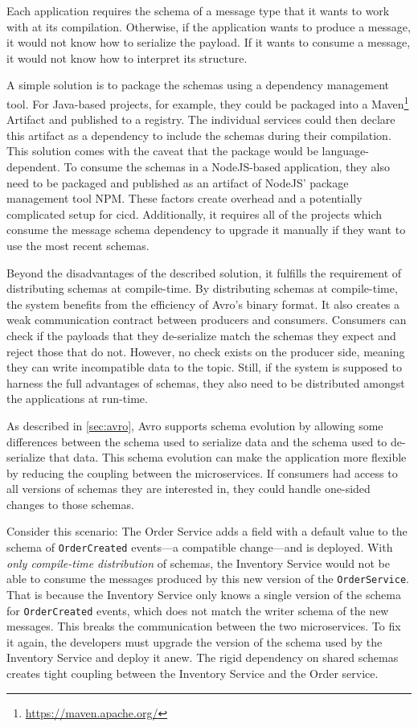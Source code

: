 Each application requires the schema of a message type that it wants to work with at its compilation.
Otherwise, if the application wants to produce a message, it would not know how to serialize the payload.
If it wants to consume a message, it would not know how to interpret its structure.

A simple solution is to package the schemas using a dependency management tool.
For Java-based projects, for example, they could be packaged into a Maven\footnote{\url{https://maven.apache.org/}} Artifact and published to a registry.
The individual services could then declare this artifact as a dependency to include the schemas during their compilation.
This solution comes with the caveat that the package would be language-dependent.
To consume the schemas in a NodeJS-based application, they also need to be packaged and published as an artifact of NodeJS' package management tool NPM.
These factors create overhead and a potentially complicated setup for \gls{cicd}.
Additionally, it requires all of the projects which consume the message schema dependency to upgrade it manually if they want to use the most recent schemas.

Beyond the disadvantages of the described solution, it fulfills the requirement of distributing schemas at compile-time.
By distributing schemas at compile-time, the system benefits from the efficiency of Avro's binary format.
It also creates a weak communication contract between producers and consumers.
Consumers can check if the payloads that they de-serialize match the schemas they expect and reject those that do not.
However, no check exists on the producer side, meaning they can write incompatible data to the topic.
Still, if the system is supposed to harness the full advantages of schemas, they also need to be distributed amongst the applications at run-time.

As described in \ref{sec:avro}, Avro supports schema evolution by allowing some differences between the schema used to serialize data and the schema used to de-serialize that data.
This schema evolution can make the application more flexible by reducing the coupling between the microservices.
If consumers had access to all versions of schemas they are interested in, they could handle one-sided changes to those schemas.

Consider this scenario: The Order Service adds a field with a default value to the schema of \texttt{OrderCreated} events---a compatible change---and is deployed.
With \emph{only compile-time distribution} of schemas, the Inventory Service would not be able to consume the messages produced by this new version of the \texttt{OrderService}.
That is because the Inventory Service only knows a single version of the schema for \texttt{OrderCreated} events, which does not match the writer schema of the new messages.
This breaks the communication between the two microservices.
To fix it again, the developers must upgrade the version of the schema used by the Inventory Service and deploy it anew.
The rigid dependency on shared schemas creates tight coupling between the Inventory Service and the Order service.

